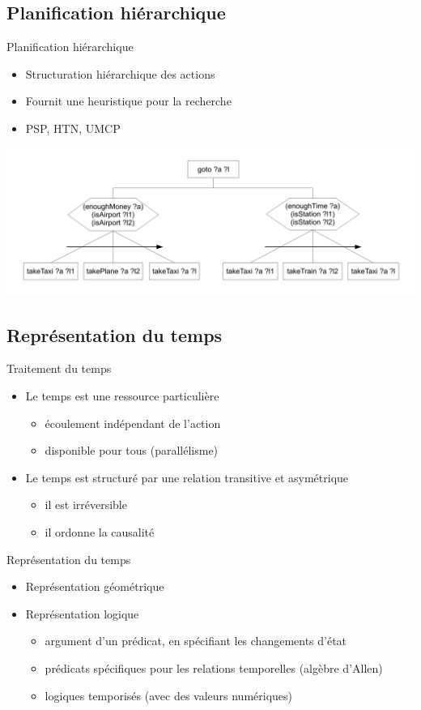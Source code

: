 \documentclass[compress]{beamer}
\begin{document}
\subsection{Planification hiérarchique}
\begin{frame}{Planification hiérarchique}
\begin{itemize}
\item Structuration hiérarchique des actions
\item Fournit une heuristique pour la recherche
\item PSP, HTN, UMCP
\end{itemize}
\begin{center}
\includegraphics[width=.8\linewidth]{exHTN}
\end{center}
\end{frame}

\subsection{Représentation du temps}
\begin{frame}{Traitement du temps}
\begin{itemize}
\item Le temps est une ressource particulière
	\begin{itemize}
	\item écoulement indépendant de l'action
	\item disponible pour tous (parallélisme)
	\end{itemize}
\item Le temps est structuré par une relation transitive et asymétrique
	\begin{itemize}
	\item il est irréversible
	\item il ordonne la causalité
	\end{itemize}
\end{itemize}
\end{frame}

\begin{frame}{Représentation du temps}
\begin{itemize}
\item Représentation géométrique
\item Représentation logique
	\begin{itemize}
	\item argument d'un prédicat, en spécifiant les changements d'état
	\item prédicats spécifiques pour les relations temporelles (algèbre d'Allen)
	\item logiques temporisés (avec des valeurs numériques)
	\end{itemize}
\end{itemize}
\end{frame}
\end{document}
